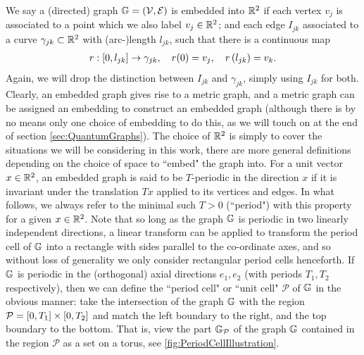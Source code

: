 We say a (directed) graph $\mathbb{G} = \left( \mathcal{V},\mathcal{E} \right)$ is embedded into $\mathbb{R}^2$ if each vertex $v_j$ is associated to a point which we also label $v_j\in\mathbb{R}^2$; and each edge $I_{jk}$ associated to a curve $\gamma_{jk}\subset\mathbb{R}^2$ with (arc-)length $l_{jk}$, such that there is a continuous map
\begin{align} \label{eq:GeneralCurveParam}
	r: \left[ 0,l_{jk} \right] \rightarrow \gamma_{jk}, \quad r(0) = v_j, \quad r\left( l_{jk} \right) = v_k.
\end{align}
Again, we will drop the distinction between $I_{jk}$ and $\gamma_{jk}$, simply using $I_{jk}$ for both.
Clearly, an embedded graph gives rise to a metric graph, and a metric graph can be assigned an embedding to construct an embedded graph (although there is by no means only one choice of embedding to do this, as we will touch on at the end of section \ref{sec:QuantumGraphs}).
The choice of $\mathbb{R}^2$ is simply to cover the situations we will be considering in this work, there are more general definitions depending on the choice of space to ``embed" the graph into.
For a unit vector $x\in\mathbb{R}^2$, an embedded graph is said to be $T$-periodic in the direction $x$ if it is invariant under the translation $Tx$ applied to its vertices and edges.
In what follows, we always refer to the minimal such $T>0$ (``period") with this property for a given $x\in\mathbb{R}^2$.
Note that so long as the graph $\mathbb{G}$ is periodic in two linearly independent directions, a linear transform can be applied to transform the period cell of $\mathbb{G}$ into a rectangle with sides parallel to the co-ordinate axes, and so without loss of generality we only consider rectangular period cells henceforth.
If $\mathbb{G}$ is periodic in the (orthogonal) axial directions $e_1, e_2$ (with periods $T_1, T_2$ respectively), then we can define the ``period cell" or ``unit cell" $\mathcal{P}$ of $\mathbb{G}$ in the obvious manner: take the intersection of the graph $\mathbb{G}$ with the region $\mathcal{P} = \left[ 0,T_1 \right]\times\left[ 0,T_2 \right]$ and match the left boundary to the right, and the top boundary to the bottom.
That is, view the part $\mathbb{G}_{\mathcal{P}}$ of the graph $\mathbb{G}$ contained in the region $\mathcal{P}$ as a set on a torus, see \ref{fig:PeriodCellIllustration}.
